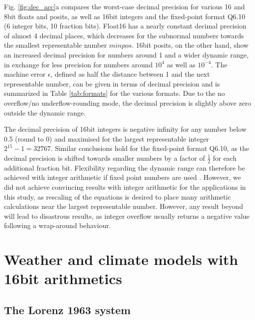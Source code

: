 \documentclass[draft]{agujournal2019}
\begin{document}
Fig. \ref{fig:dec_acc}a compares the worst-case decimal precision for various 16 and 8bit floats and posits, as well as 16bit integers and the fixed-point format Q6.10 (6 integer bits, 10 fraction bits). Float16 has a nearly constant decimal precision of almost 4 decimal places, which decreases for the subnormal numbers towards the smallest representable number $minpos$. 16bit posits, on the other hand, show an increased decimal precision for numbers around 1 and a wider dynamic range, in exchange for less precision for numbers around $10^4$ as well as $10^{-4}$.  The machine error $\epsilon$, defined as half the distance between 1 and the next representable number, can be given in terms of decimal precision and is summarized in Table \ref{tab:formats} for the various formats. Due to the no overflow/no underflow-rounding mode, the decimal precision is slightly above zero outside the dynamic range. 

The decimal precision of 16bit integers is negative infinity for any number below 0.5 (round to 0) and maximised for the largest representable integer $2^{15} - 1 =  32767$. Similar conclusions hold for the fixed-point format Q6.10, as the decimal precision is shifted towards smaller numbers by a factor of $\tfrac{1}{2}$ for each additional fraction bit. Flexibility regarding the dynamic range can therefore be achieved with integer arithmetic if fixed point numbers are used \cite{Russell2017}. However, we did not achieve convincing results with integer arithmetic for the applications in this study, as rescaling of the equations is desired to place many arithmetic calculations near the largest representable number. However, any result beyond will lead to disastrous results, as integer overflow usually returns a negative value following a wrap-around behaviour. 


\section{Weather and climate models with 16bit arithmetics}


\subsection{The Lorenz 1963 system}
\label{sec:L63}
\end{document}
